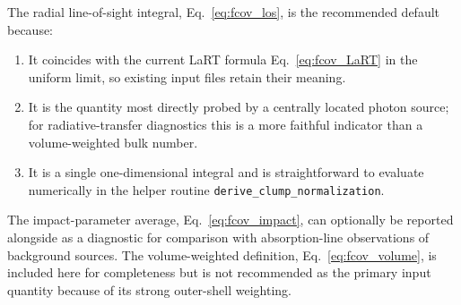 \documentclass[english,a4paper]{my_memo}
\begin{document}
The radial line-of-sight integral, Eq.~\eqref{eq:fcov_los}, is the
recommended default because:

\begin{enumerate}
\item It coincides with the current LaRT formula
      Eq.~\eqref{eq:fcov_LaRT} in the uniform limit, so existing input
      files retain their meaning.
\item It is the quantity most directly probed by a centrally located
      photon source; for radiative-transfer diagnostics this is a more
      faithful indicator than a volume-weighted bulk number.
\item It is a single one-dimensional integral and is straightforward
      to evaluate numerically in the helper routine
      \texttt{derive\_clump\_\-normalization}.
\end{enumerate}

The impact-parameter average, Eq.~\eqref{eq:fcov_impact}, can optionally
be reported alongside as a diagnostic for comparison with absorption-line
observations of background sources.  The volume-weighted definition,
Eq.~\eqref{eq:fcov_volume}, is included here for completeness but is not
recommended as the primary input quantity because of its strong outer-shell
weighting.
\end{document}
